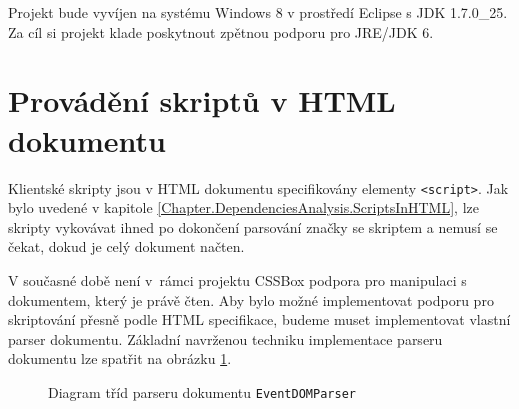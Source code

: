 Projekt bude vyvíjen na systému Windows 8 v prostředí Eclipse s JDK 1.7.0\_25. Za cíl si projekt klade poskytnout zpětnou podporu pro JRE/JDK 6.
 
\section{Provádění skriptů v HTML dokumentu}
\label{Chapter.Design.ScriptsInHTML}

Klientské skripty jsou v HTML dokumentu specifikovány elementy \texttt{<script>}. Jak bylo uvedené v kapitole \ref{Chapter.DependenciesAnalysis.ScriptsInHTML}, lze skripty vykovávat ihned po dokončení parsování značky se skriptem a nemusí se čekat, dokud je celý dokument načten. 

V současné době není v~rámci projektu CSSBox podpora pro manipulaci s dokumentem, který je právě čten. Aby bylo možné implementovat podporu pro skriptování přesně podle HTML specifikace, budeme muset implementovat vlastní parser dokumentu. Základní navrženou techniku implementace parseru dokumentu lze spatřit na obrázku \ref{Figure.EventDOMParserDesign}.

\begin{figure}[H]
  \begin{center}
    \caption{Diagram tříd parseru dokumentu \texttt{EventDOMParser}}
    \label{Figure.EventDOMParserDesign}
  \end{center}
\end{figure}

